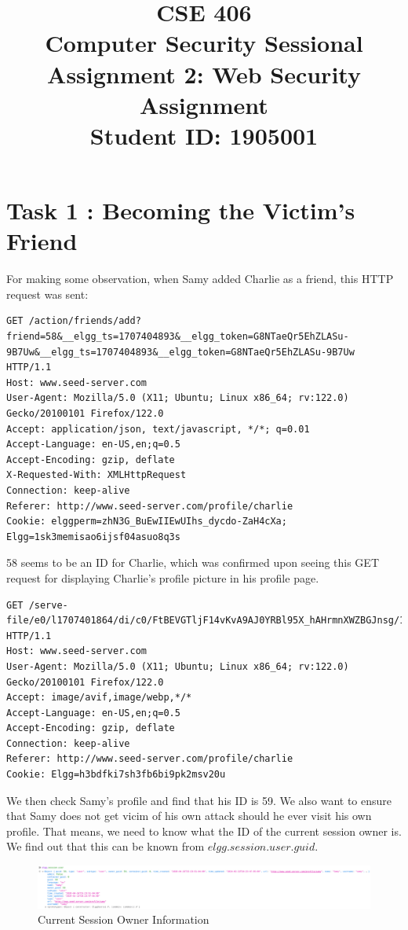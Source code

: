 \documentclass[12pt]{article}
\title{CSE 406 \\
Computer Security Sessional \\
\vspace{10mm}
Assignment 2: Web Security Assignment \\
\vspace{20mm}
Student ID: 1905001 \\
\vspace{15mm}
\RaggedRight
}
\author{}
\date{}
\begin{document}
\maketitle
\newpage

\section*{Task 1 : Becoming the Victim’s Friend}
For making some observation, when Samy added Charlie as a friend, this HTTP request was sent:

\begin{verbatim}
GET /action/friends/add?friend=58&__elgg_ts=1707404893&__elgg_token=G8NTaeQr5EhZLASu-9B7Uw&__elgg_ts=1707404893&__elgg_token=G8NTaeQr5EhZLASu-9B7Uw HTTP/1.1
Host: www.seed-server.com
User-Agent: Mozilla/5.0 (X11; Ubuntu; Linux x86_64; rv:122.0) Gecko/20100101 Firefox/122.0
Accept: application/json, text/javascript, */*; q=0.01
Accept-Language: en-US,en;q=0.5
Accept-Encoding: gzip, deflate
X-Requested-With: XMLHttpRequest
Connection: keep-alive
Referer: http://www.seed-server.com/profile/charlie
Cookie: elggperm=zhN3G_BuEwIIEwUIhs_dycdo-ZaH4cXa; Elgg=1sk3memisao6ijsf04asuo8q3s
\end{verbatim}

58 seems to be an ID for Charlie, which was confirmed upon seeing this GET request for displaying Charlie's profile picture in his profile page.

\begin{verbatim}
GET /serve-file/e0/l1707401864/di/c0/FtBEVGTljF14vKvA9AJ0YRBl95X_hAHrmnXWZBGJnsg/1/58/profile/58large.jpg HTTP/1.1
Host: www.seed-server.com
User-Agent: Mozilla/5.0 (X11; Ubuntu; Linux x86_64; rv:122.0) Gecko/20100101 Firefox/122.0
Accept: image/avif,image/webp,*/*
Accept-Language: en-US,en;q=0.5
Accept-Encoding: gzip, deflate
Connection: keep-alive
Referer: http://www.seed-server.com/profile/charlie
Cookie: Elgg=h3bdfki7sh3fb6bi9pk2msv20u
\end{verbatim}

We then check Samy's profile and find that his ID is 59. We also want to ensure that Samy does not get vicim of his own attack should he ever visit his own profile. That means, we need to know what the ID of the current session owner is. We find out that this can be known from $elgg.session.user.guid$.

     \begin{figure}[H]
         \centering
         \includegraphics[width=\textwidth]{Images/ss6.png}
         \caption{Current Session Owner Information}
         \label{fig:ss6}
     \end{figure}
\end{document}
